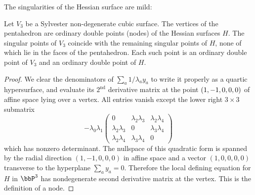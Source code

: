 The singularities of the Hessian surface are mild:

\begin{lemm}\label{newsing}
Let $V_3$ be a Sylvester non-degenerate cubic surface. The vertices of the pentahedron are ordinary double points (nodes) of the Hessian surfaces $H$. The singular points of $V_3$ coincide with the remaining singular points of $H$, none of which lie in the faces of the pentahedron. Each such point is an ordinary double point of $V_3$ and an ordinary double point of $H$.
\end{lemm}

\pagebreak
\begin{proof}
We clear the denominators of $\sum_a1/\lambda_ay_a$ to write it properly as a quartic hypersurface, and evaluate its $2^{\text{nd}}$ derivative matrix at the point $(1,-1,\discretionary{}{}{}0,\discretionary{}{}{}0,0)$ of affine space lying over a vertex. All entries vanish except the lower right $3\times3$ submatrix
\begin{equation*}
-\lambda_0\lambda_1
\begin{pmatrix}
0&\lambda_2\lambda_3&\lambda_2\lambda_4
\\
\lambda_2\lambda_3&0&\lambda_3\lambda_4
\\
\lambda_2\lambda_4&\lambda_3\lambda_4&0
\end{pmatrix}
\end{equation*}
which has nonzero determinant. The nullspace of this quadratic form is spanned by the radial direction $(1,-1,0,0,0)$ in affine space and a vector $(1,0,0,0,0)$ transverse to the hyperplane $\sum_ay_a=0$. Therefore the local defining equation for $H$ in $\bbP^3$ has nondegenerate second derivative matrix at the vertex. This is the definition of a node.



\end{proof}
